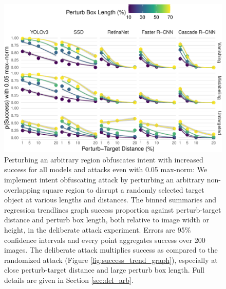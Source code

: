 \begin{figure}[tb]

{\centering \includegraphics[width=1\linewidth]{imgs/arbitrary_trend_graph-normed} 

}

\caption{Perturbing an arbitrary region obfuscates intent with increased success for all models and attacks even with 0.05 max-norm:  We implement intent obfuscating attack by perturbing an arbitrary non-overlapping square region to disrupt a randomly selected target object at various lengths and distances. The binned summaries and regression trendlines graph success proportion against perturb-target distance and perturb box length, both relative to image width or height, in the deliberate attack experiment. Errors are 95\% confidence intervals and every point aggregates success over 200 images. The deliberate attack multiplies success as compared to the randomized attack (Figure \ref{fig:success_trend_graph}), especially at close perturb-target distance and large perturb box length. Full details are given in Section \ref{sec:del_arb}.}\label{fig:arbitrary_trend_graph_normed}
\end{figure}

